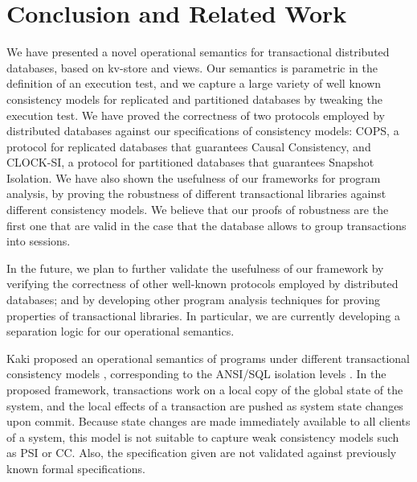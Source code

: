 \section{Conclusion and Related Work}
\label{sec:conclusions}
We have presented a novel operational semantics for 
transactional distributed databases, based on kv-store and views. 
Our semantics is parametric in the definition of an execution test, 
and we capture a large variety of well known consistency models 
for replicated and partitioned databases by tweaking the execution test. 
We have proved the correctness of two protocols employed by distributed 
databases against our specifications of consistency models: COPS, a 
protocol for replicated databases that guarantees Causal Consistency, 
and CLOCK-SI, a protocol for partitioned databases that guarantees 
Snapshot Isolation. We have also shown the usefulness of our frameworks 
for program analysis, by proving the robustness of different transactional 
libraries against different consistency models. We believe that our proofs of 
robustness are the first one that are valid in the case that the database allows 
to group transactions into sessions. 

In the future, we plan to further validate the usefulness of our framework by 
verifying the correctness of other well-known protocols employed by 
distributed databases; and by developing other program analysis techniques 
for proving properties of transactional libraries. In particular, we are currently 
developing a separation logic for our operational semantics.

Kaki \etal proposed an operational semantics of programs 
under different transactional consistency models \cite{alonetogether}, 
corresponding to the ANSI/SQL isolation levels \cite{si}.
In the proposed framework, transactions work on a local copy of the global state 
of the system, and the local effects of a transaction are pushed as 
system state changes upon commit. Because state changes 
are made immediately available to all clients of a system, this model 
is not suitable to capture weak consistency models such as PSI or CC. 
Also, the specification given are not validated against previously known 
formal specifications.

